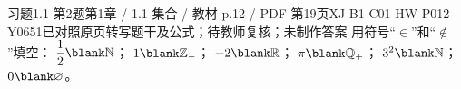 \par\noindent\begin{minipage}{\linewidth}
\begin{bankitem}{习题1.1 第2题}{第1章 / 1.1 集合 / 教材 p.12 / PDF 第19页}{XJ-B1-C01-HW-P012-Y0651}{已对照原页转写题干及公式；待教师复核；未制作答案}
用符号“$\in$”和“$\notin$”填空：
$\dfrac12\blank\mathbb N$；
$1\blank\mathbb Z_-$；
$-2\blank\mathbb R$；
$\pi\blank\mathbb Q_+$；
$3^2\blank\mathbb N$；
$0\blank\varnothing$。
\end{bankitem}
\end{minipage}\par\medskip
